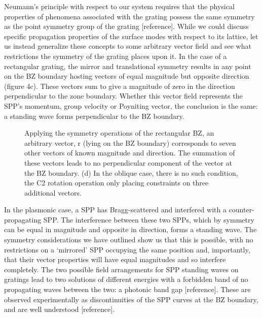 \documentclass[oneside,11pt,book]{book}
\begin{document}
Neumann’s principle with respect to our system requires that the physical properties of phenomena associated with the grating possess the same symmetry as the point symmetry group of the grating [reference]. While we could discuss specific propagation properties of the surface modes with respect to its lattice, let us instead generalize these concepts to some arbitrary vector field and see what restrictions the symmetry of the grating places upon it.
In the case of a rectangular grating, the mirror and translational symmetry results in any point on the BZ boundary hosting vectors of equal magnitude but opposite direction (figure 4c). These vectors sum to give a magnitude of zero in the direction perpendicular to the zone boundary. Whether this vector field represents the SPP’s momentum, group velocity or Poyniting vector, the conclusion is the same: a standing wave forms perpendicular to the BZ boundary.
\begin{figure}
\centering 
\caption{Applying the symmetry operations of the rectangular BZ, an arbitrary vector, r (lying on the BZ boundary) corresponds to seven other vectors of known magnitude and direction. The summation of these vectors leads to no perpendicular component of the vector at the BZ boundary. (d) In the oblique case, there is no such condition, the C2 rotation operation only placing constraints on three additional vectors.}
\end{figure}
In the plasmonic case, a SPP has Bragg-scattered and interfered with a counter-propagating SPP. The interference between these two SPPs, which by symmetry can be equal in magnitude and opposite in direction, forms a standing wave. The symmetry considerations we have outlined show us that this is possible, with no restrictions on a ‘mirrored’ SPP occupying the same position and, importantly, that their vector properties will have equal magnitudes and so interfere completely. The two possible field arrangements for SPP standing waves on gratings lead to two solutions of different energies with a forbidden band of no propagating waves between the two: a photonic band gap [reference]. These are observed experimentally as discontinuities of the SPP curves at the BZ boundary, and are well understood [reference]. 
\end{document}
